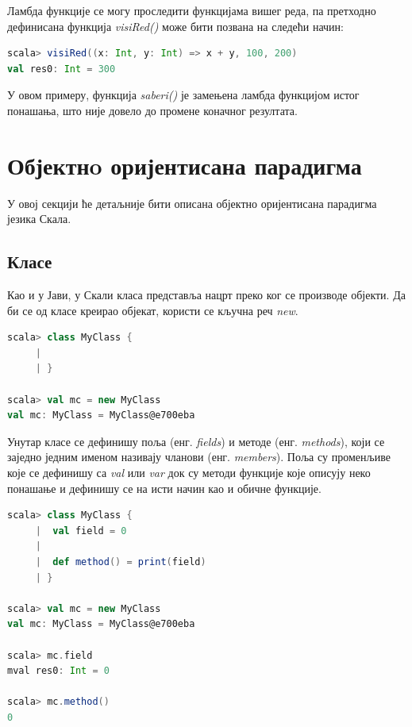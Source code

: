 \documentclass[12pt,oneside]{memoir}
\begin{document}
Ламбда функције се могу проследити функцијама вишег реда, па претходно дефинисана функција \textit{visiRed()} може бити позвана на следећи начин:

\begin{lstlisting}[language=Scala, caption={Прослеђивање ламбда функције другој функцији}, label={lst:scala_functions_lambda_high_order}]
scala> visiRed((x: Int, y: Int) => x + y, 100, 200)
val res0: Int = 300
\end{lstlisting}

У овом примеру, функција \textit{saberi()} је замењена ламбда функцијом истог понашања, што није довело до промене коначног резултата. 

\section{Објектнo оријентисана парадигма}
\label{sec:scala_oop}

У овој секцији ће детаљније бити описана објектно оријентисана парадигма језика Скала. 

\subsection{Класе}
\label{subsec:scala_klase}

Као и у Јави, у Скали класа представља нацрт преко ког се производе објекти. Да би се од класе креирао објекат, користи се кључна реч \textit{new}.

\begin{lstlisting}[language=Scala, caption={Дефиниција и инстанцирање класе у Скали}, label={lst:scala_oop_class_instance}]
scala> class MyClass {
     |     
     | }

scala> val mc = new MyClass
val mc: MyClass = MyClass@e700eba
\end{lstlisting}

Унутар класе се дефинишу поља (енг. \textit{fields}) и методе (енг. \textit{methods}), који се заједно једним именом називају чланови (енг. \textit{members}). Поља су променљиве које се дефинишу са \textit{val} или \textit{var} док су методи функције које описују неко понашање и дефинишу се на исти начин као и обичне функције. \cite{scala_prog}

\begin{lstlisting}[language=Scala, caption={Чланови класе}, label={lst:scala_oop_members_class}]
scala> class MyClass {
     |  val field = 0
     |  
     |  def method() = print(field)
     | }

scala> val mc = new MyClass
val mc: MyClass = MyClass@e700eba

scala> mc.field
mval res0: Int = 0

scala> mc.method()
0
\end{lstlisting}
\end{document}
